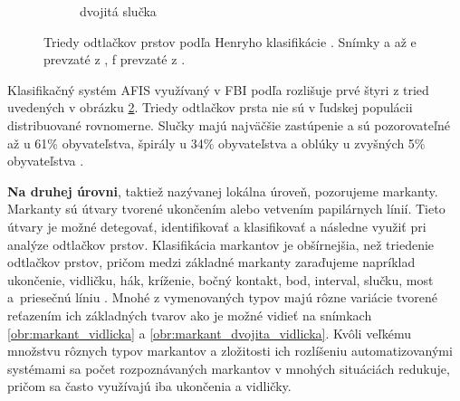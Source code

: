 \begin{figure}[h]
\begin{subfigure}[b]{0.19\linewidth}
      \caption{dvojitá slučka}
      \label{obr:triedy_odtlackov/dvojita_slucka}
    \end{subfigure}
    \caption{Triedy odtlačkov prstov podľa Henryho klasifikácie \cite{Henry}. Snímky a až e prevzaté z \cite{Handbook}, f prevzaté z \cite{Drahansky}.}
    \label{obr:triedy_odtlackov}
  \end{figure}

  Klasifikačný systém AFIS využívaný v FBI podľa \cite{FingerprintSrcBook} rozlišuje prvé štyri z tried uvedených v obrázku \ref{obr:triedy_odtlackov}.
  Triedy odtlačkov prsta nie sú v ľudskej populácii distribuované rovnomerne.
  Slučky majú najväčšie zastúpenie a sú pozorovateľné až u 61\% obyvateľstva, špirály u 34\% obyvateľstva a oblúky u zvyšných
  5\% obyvateľstva \cite{sciencing}.

  \textbf{Na druhej úrovni}, taktiež nazývanej lokálna úroveň, pozorujeme markanty. Markanty sú útvary tvorené ukončením alebo
  vetvením papilárnych línií. Tieto útvary je možné detegovať, identifikovať a klasifikovať a následne využiť pri analýze odtlačkov prstov.
  Klasifikácia markantov je obšírnejšia, než triedenie odtlačkov prstov, pričom medzi základné markanty zaraďujeme napríklad
  ukončenie, vidličku, hák, kríženie, bočný kontakt, bod, interval, slučku, most a~priesečnú líniu \cite{Drahansky}. Mnohé z vymenovaných typov majú rôzne
  variácie tvorené reťazením ich základných tvarov ako je možné vidieť na snímkach \ref{obr:markant_vidlicka} a \ref{obr:markant_dvojita_vidlicka}.
  Kvôli veľkému množstvu rôznych typov markantov a zložitosti ich rozlíšeniu automatizovanými systémami sa počet rozpoznávaných markantov v mnohých
  situáciách redukuje, pričom sa často využívajú iba ukončenia a vidličky.

